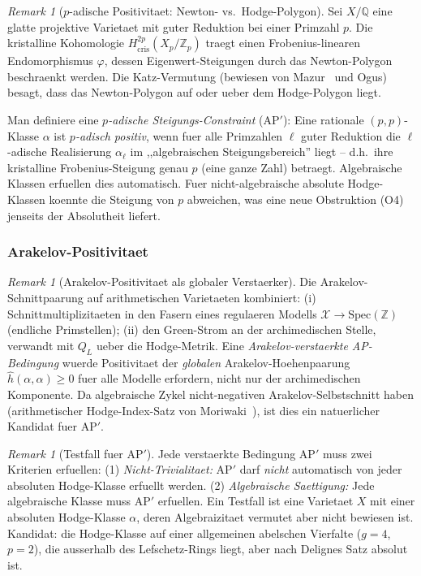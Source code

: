 \documentclass[aps,prd,twocolumn,superscriptaddress,nofootinbib]{revtex4-2}
\theoremstyle{definition}
\theoremstyle{remark}
\newtheorem{remark}[theorem]{Remark}
\begin{document}
\begin{remark}[$p$-adische Positivitaet: Newton- vs.\ Hodge-Polygon]
\label{rem:newton-hodge}
Sei $X/\mathbb{Q}$ eine glatte projektive Varietaet mit guter Reduktion bei einer Primzahl $p$. Die kristalline Kohomologie $H^{2p}_{\mathrm{cris}}(X_p/\mathbb{Z}_p)$ traegt einen Frobenius-linearen Endomorphismus $\varphi$, dessen Eigenwert-Steigungen durch das Newton-Polygon beschraenkt werden. Die Katz-Vermutung (bewiesen von Mazur~\cite{Mazur1972} und Ogus) besagt, dass das Newton-Polygon auf oder ueber dem Hodge-Polygon liegt.

Man definiere eine \textit{$p$-adische Steigungs-Constraint} (AP$'$): Eine rationale $(p,p)$-Klasse $\alpha$ ist \textit{$p$-adisch positiv}, wenn fuer alle Primzahlen $\ell$ guter Reduktion die $\ell$-adische Realisierung $\alpha_\ell$ im ,,algebraischen Steigungsbereich'' liegt -- d.h.\ ihre kristalline Frobenius-Steigung genau $p$ (eine ganze Zahl) betraegt. Algebraische Klassen erfuellen dies automatisch. Fuer nicht-algebraische absolute Hodge-Klassen koennte die Steigung von $p$ abweichen, was eine neue Obstruktion (O4) jenseits der Absolutheit liefert.
\end{remark}

\subsubsection{Arakelov-Positivitaet}

\begin{remark}[Arakelov-Positivitaet als globaler Verstaerker]
\label{rem:arakelov-positivity}
Die Arakelov-Schnittpaarung auf arithmetischen Varietaeten kombiniert: (i) Schnittmultiplizitaeten in den Fasern eines regulaeren Modells $\mathcal{X} \to \mathrm{Spec}(\mathbb{Z})$ (endliche Primstellen); (ii) den Green-Strom an der archimedischen Stelle, verwandt mit $Q_L$ ueber die Hodge-Metrik. Eine \textit{Arakelov-verstaerkte AP-Bedingung} wuerde Positivitaet der \textit{globalen} Arakelov-Hoehenpaarung $\hat{h}(\alpha, \alpha) \geq 0$ fuer alle Modelle erfordern, nicht nur der archimedischen Komponente. Da algebraische Zykel nicht-negativen Arakelov-Selbstschnitt haben (arithmetischer Hodge-Index-Satz von Moriwaki~\cite{Moriwaki1999}), ist dies ein natuerlicher Kandidat fuer AP$'$.
\end{remark}

\begin{remark}[Testfall fuer AP$'$]
\label{rem:test-case-ap-prime}
Jede verstaerkte Bedingung AP$'$ muss zwei Kriterien erfuellen: (1) \textit{Nicht-Trivialitaet:} AP$'$ darf \textit{nicht} automatisch von jeder absoluten Hodge-Klasse erfuellt werden. (2) \textit{Algebraische Saettigung:} Jede algebraische Klasse muss AP$'$ erfuellen. Ein Testfall ist eine Varietaet $X$ mit einer absoluten Hodge-Klasse $\alpha$, deren Algebraizitaet vermutet aber nicht bewiesen ist. Kandidat: die Hodge-Klasse auf einer allgemeinen abelschen Vierfalte ($g = 4$, $p = 2$), die ausserhalb des Lefschetz-Rings liegt, aber nach Delignes Satz absolut ist.
\end{remark}
\end{document}
